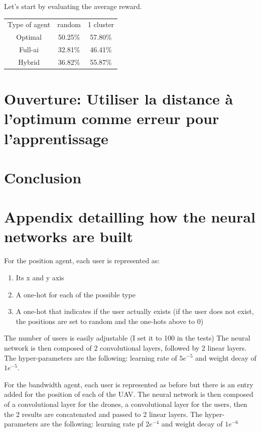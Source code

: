 \documentclass[letterpaper]{article}
\begin{document}
Let's start by evaluating the average reward.

\begin{center}
    \begin{tabular}{ c c c }
     Type of agent & random & 1 cluster \\ 
     Optimal & 50.25\% & 57.80\% \\  
     Full-ai & 32.81\% & 46.41\%  \\
     Hybrid &  36.82\% & 55.87\% 
    \end{tabular}
\end{center}


\section{Ouverture: Utiliser la distance à l'optimum comme erreur pour l'apprentissage}

\section{Conclusion}






\appendix

\section{Appendix detailling how the neural networks are built}

For the position agent, each user is represented as:
\begin{enumerate}
    \item Its x and y axis
    \item A one-hot for each of the possible type
    \item A one-hot that indicates if the user actually exists (if the user does not exist, the positions are set to random and the one-hots above to 0)
\end{enumerate}

The number of users is easily adjustable (I set it to 100 in the tests)
The neural network is then composed of 2 convolutional layers, followed by 2 linear layers.
The hyper-parameters are the following: learning rate of $5e^{-5}$ and weight decay of $1e^{-5}$.

\;

For the bandwidth agent, each user is represented as before but there is an entry added for the position of each of the UAV.
The neural network is then composed of a convolutional layer for the drones, a convolutional layer for the users,
then the 2 results are concatenated and passed to 2 linear layers.
The hyper-parameters are the following: learning rate pf $2e^{-4}$ and weight decay of $1e^{-6}$
\end{document}
